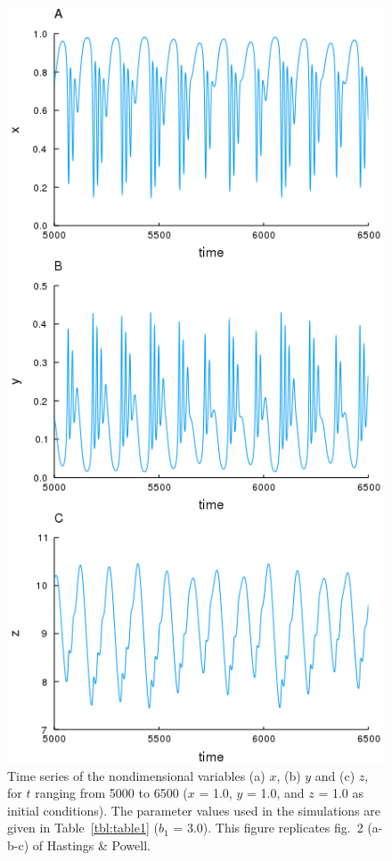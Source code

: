 \documentclass[
]{article}
\begin{document}
\begin{figure}
\hypertarget{fig:fig2}{%
\centering
\includegraphics{figures/fig2.png}
\caption{Time series of the nondimensional variables (a) \(x\), (b)
\(y\) and (c) \(z\), for \(t\) ranging from 5000 to 6500 (\(x\) = 1.0,
\(y\) = 1.0, and \(z\) = 1.0 as initial conditions). The parameter
values used in the simulations are given in Table~\ref{tbl:table1}
(\(b_1\) = 3.0). This figure replicates fig.~2 (a-b-c) of Hastings \&
Powell.}\label{fig:fig2}
}
\end{figure}
\end{document}
